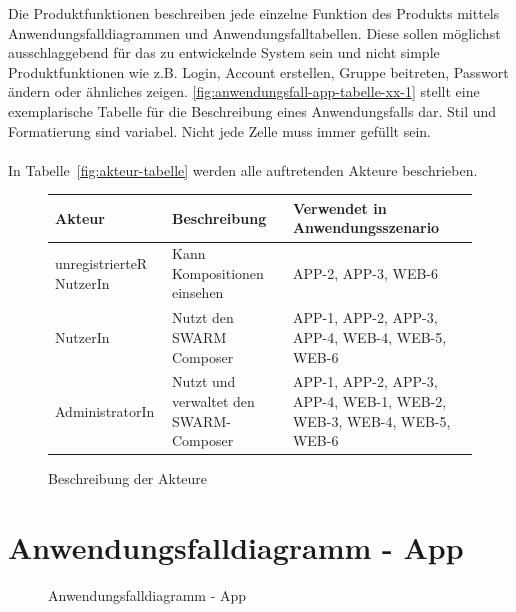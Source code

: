 \begin{tcolorbox}
Die Produktfunktionen beschreiben jede einzelne Funktion des Produkts mittels Anwendungsfalldiagrammen und Anwendungsfalltabellen.
Diese sollen möglichst ausschlaggebend für das zu entwickelnde System sein und nicht simple Produktfunktionen wie z.B. Login, Account erstellen, Gruppe beitreten, Passwort ändern oder ähnliches zeigen.
\autoref{fig:anwendungsfall-app-tabelle-xx-1} stellt eine exemplarische Tabelle für die Beschreibung eines Anwendungsfalls dar. Stil und Formatierung sind variabel. Nicht jede Zelle muss immer gefüllt sein.
\\\\
In  Tabelle~\autoref{fig:akteur-tabelle} werden alle auftretenden Akteure beschrieben.


\end{tcolorbox}

\begin{figure}[h]
	\centering

	\begin{tabularx}{\textwidth}{ p{} | p{} | X }
		\textbf{Akteur} & \textbf{Beschreibung} & \textbf{Verwendet in Anwendungsszenario} \\ \hline
		unregistrierteR NutzerIn & Kann Kompositionen einsehen & APP-2, APP-3, WEB-6
		\\ \hline NutzerIn & Nutzt den SWARM Composer & APP-1, APP-2, APP-3, APP-4, WEB-4, WEB-5, WEB-6
		\\ \hline AdministratorIn & Nutzt und verwaltet den SWARM-Composer & APP-1, APP-2, APP-3, APP-4, WEB-1, WEB-2, WEB-3, WEB-4, WEB-5, WEB-6
	\end{tabularx}

	\caption{Beschreibung der Akteure}
	\label{fig:akteur-tabelle}
\end{figure}



\section{Anwendungsfalldiagramm - App}

\begin{figure}[h]
	\centering
	\caption{Anwendungsfalldiagramm - App}
	\label{fig:anwendungsfalldiagramm-app}
\end{figure}

\newpage

